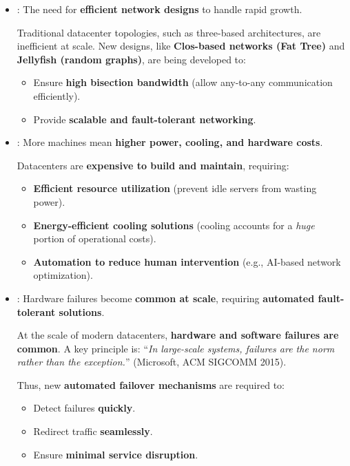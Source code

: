 \begin{itemize}
    \item {}: The need for \textbf{efficient network designs} to handle rapid growth.
    
    Traditional datacenter topologies, such as three-based architectures, are inefficient at scale. New designs, like \textbf{Clos-based networks (Fat Tree)} and \textbf{Jellyfish (random graphs)}, are being developed to:
    \begin{itemize}[label=\textcolor{Green3}{}]
        \item Ensure \textbf{high bisection bandwidth} (allow any-to-any communication efficiently).
        \item Provide \textbf{scalable and fault-tolerant networking}.
    \end{itemize}
    
    \newpage

    \item {}: More machines mean \textbf{higher power, cooling, and hardware costs}.
    
    Datacenters are \textbf{expensive to build and maintain}, requiring:
    \begin{itemize}
        \item \textbf{Efficient resource utilization} (prevent idle servers from wasting power).
        \item \textbf{Energy-efficient cooling solutions} (cooling accounts for a \emph{huge} portion of operational costs).
        \item \textbf{Automation to reduce human intervention} (e.g., AI-based network optimization).
    \end{itemize}
    
    
    \item {}: Hardware failures become \textbf{common at scale}, requiring \textbf{automated fault-tolerant solutions}.
    
    At the scale of modern datacenters, \textbf{hardware and software failures are common}. A key principle is: ``\emph{In large-scale systems, failures are the norm rather than the exception.}'' (Microsoft, ACM SIGCOMM 2015).

    Thus, new \textbf{automated failover mechanisms} are required to:
    \begin{itemize}
        \item Detect failures \textbf{quickly}.
        \item Redirect traffic \textbf{seamlessly}.
        \item Ensure \textbf{minimal service disruption}.
    \end{itemize}


\end{itemize}
